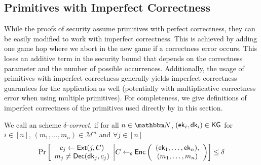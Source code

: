 \subsection{Primitives with Imperfect Correctness}
While the proofs of \saik security assume primitives with perfect correctness, they can be easily modified to work with
imperfect correctness. This is achieved by adding one game hop where we
abort in the new game if a correctness error occurs. This loses an additive term in the security bound that depends on
the correctness parameter and the number of possible occurrences. Additionally, the usage of primitives with imperfect
correctness generally yields imperfect correctness guarantees for the application as well (potentially with
multiplicative correctness error when using multiple primitives). For completeness, we give definitions of imperfect
correctness of the primitives used directly by \saik in this section.

\begin{definition}
We call an \mmPKE scheme \emph{$\delta$-correct}, if for all $n\in \N$, $({\mathsf{ek}}_i,{\mathsf{dk}}_i)\in
  {\ensuremath{\mathsf{KG}}} $ for $i\in[n]$,
  $(m_1,\ldots, m_n)\in\mathcal{M}^n$ and $\forall j\in[n]$
  \[
    \Pr\left[
      \begin{array}{c}
        c_j\gets {\ensuremath{\mathsf{Ext}}}(j, C)\\
        m_j \neq {\ensuremath{\mathsf{Dec}}}({\mathsf{dk}}_j, c_j)
      \end{array}
      \middle\vert
      C \gets_{\scriptscriptstyle\$} {\mathsf{Enc}}\left(
      \begin{array}{c}
        ({\mathsf{ek}}_1,\ldots, {\mathsf{ek}}_n),\\(m_1,\ldots,m_n)
      \end{array}
      \right)
    \right] \leq \delta
  \]
\end{definition}


